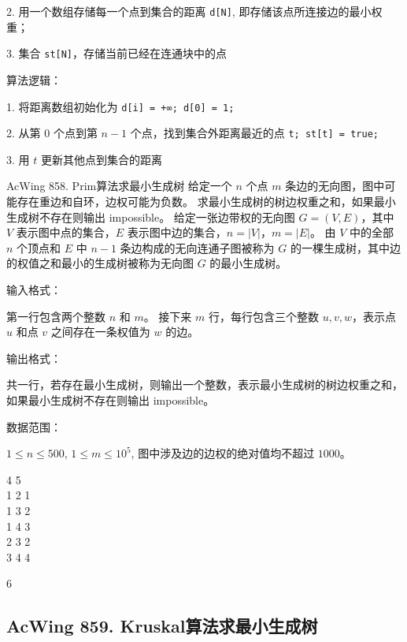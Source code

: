 2. 用一个数组存储每一个点到集合的距离 \lstinline{d[N]}, 即存储该点所连接边的最小权重；

3. 集合 \lstinline{st[N]}，存储当前已经在连通块中的点

算法逻辑：

1. 将距离数组初始化为 \lstinline{d[i] = +∞; d[0] = 1;}

2. 从第 $0$ 个点到第 $n - 1$ 个点，找到集合外距离最近的点 \lstinline{t; st[t] = true;}

3. 用 $t$ 更新其他点到集合的距离

\begin{titledbox}{AcWing 858. Prim算法求最小生成树}
    给定一个 $n$ 个点 $m$ 条边的无向图，图中可能存在重边和自环，边权可能为负数。 求最小生成树的树边权重之和，如果最小生成树不存在则输出 impossible。 给定一张边带权的无向图 $G=(V, E)$，其中 $V$ 表示图中点的集合，$E$ 表示图中边的集合，$n=|V|$，$m=|E|$。 由 $V$ 中的全部 $n$ 个顶点和 $E$ 中 $n-1$ 条边构成的无向连通子图被称为 $G$ 的一棵生成树，其中边的权值之和最小的生成树被称为无向图 $G$ 的最小生成树。

    输入格式：

    第一行包含两个整数 $n$ 和 $m$。 接下来 $m$ 行，每行包含三个整数 $u,v,w$，表示点 $u$ 和点 $v$ 之间存在一条权值为 $w$ 的边。

    输出格式：

    共一行，若存在最小生成树，则输出一个整数，表示最小生成树的树边权重之和，如果最小生成树不存在则输出 impossible。

    数据范围：

    $1 \le n \le 500$, $1 \le m \le 10^5$, 图中涉及边的边权的绝对值均不超过 $1000$。

    \begin{inputblock}
        4 5 \\
        1 2 1 \\
        1 3 2 \\
        1 4 3 \\
        2 3 2 \\
        3 4 4
    \end{inputblock}
    \begin{outputblock}
        6
    \end{outputblock}
\end{titledbox}

\subsection{AcWing 859. Kruskal算法求最小生成树}

